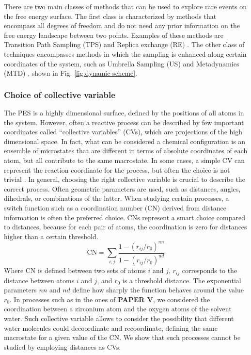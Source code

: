 There are two main classes of methods that can be used to explore rare events on the free energy surface. The first class is characterized by methods that encompass all degrees of freedom and do not need any prior information on the free energy landscape between two points. Examples of these methods are Transition Path Sampling (TPS) \cite{dellago2002transition} and Replica exchange (RE) \cite{sugita1999replica}. The other class of techniques encompasses methods in which the sampling is enhanced along certain coordinates of the system, such as Umbrella Sampling (US) \cite{torrie1977nonphysical, patey1975monte} and Metadynamics (MTD) \cite{laio2002escaping}, shown in Fig. \ref{fig:dynamic-scheme}.


\subsubsection*{Choice of collective variable}
The PES is a highly dimensional surface, defined by the positions of all atoms in the system. However, often a reactive process can be described by few important coordinates called ``collective variables'' (CVs), which are projections of the high dimensional space. In fact, what can be considered a chemical configuration is an ensemble of microstates that are different in terms of absolute coordinates of each atom, but all contribute to the same macrostate. In some cases, a simple CV can represent the reaction coordinate for the process, but often the choice is not trivial \cite{rohrdanz2013discovering}. In general, choosing the right collective variable is crucial to describe the correct process. Often geometric parameters are used, such as distances, angles, dihedrals, or combinations of the latter. When studying certain processes, a switch function such as a coordination number (CN) derived from distance information is often the preferred choice. CNs represent a smart choice compared to distances, because for each pair of atoms, the coordination is zero for distances higher than a certain threshold.
\[
\mathrm{CN} =\sum_{i,j}\frac{1-(r_{ij}/r_0 )^{nn}}{1-(r_{ij}/r_0 )^{nd}}
\] 
Where CN is defined between two sets of atoms ${i}$ and ${j}$, $r_{ij}$ corresponds to the distance between atoms $i$ and $j$, and $r_0$ is a threshold distance. The exponential parameters $nn$ and $nd$ define how sharply the function behaves around the value $r_0$. In processes such as in the ones of \textbf{PAPER V}, we considered the coordination between a zirconium atom and the oxygen atoms of the solvent water. Such collective variable allows to consider the possibility that different water molecules could decoordinate and recoordinate, defining the same macrostate for a given value of the CN. We show that such processes cannot be studied by employing distances as CVs.

